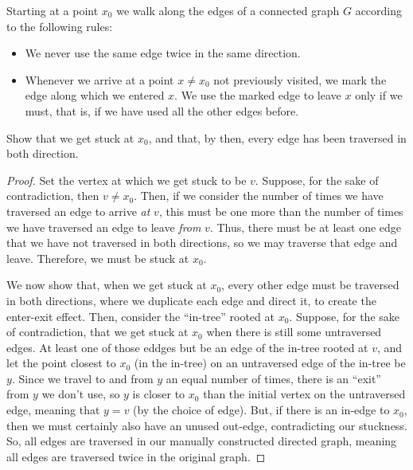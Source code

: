 \documentclass[11pt]{article}
\begin{document}
\begin{quest}
    Starting at a point $x_0$ we walk along the edges of a connected graph $G$ according to the following rules:
    \begin{itemize}
        \item We never use the same edge twice in the same direction.
        \item Whenever we arrive at a point $x\neq x_0$ not previously visited, we mark the edge along which we entered $x$. We use the marked edge to leave $x$ only if we must, that is, if we have used all the other edges before.
    \end{itemize}
    Show that we get stuck at $x_0$, and that, by then, every edge has been traversed in both direction.
\end{quest}
\begin{proof}
    Set the vertex at which we get stuck to be $v$. Suppose, for the sake of contradiction, then $v\neq x_0$. Then, if we consider the number of times we have traversed an edge to arrive \textit{at} $v$, this must be one more than the number of times we have traversed an edge to leave \textit{from} $v$. Thus, there must be at least one edge that we have not traversed in both directions, so we may traverse that edge and leave. Therefore, we must be stuck at $x_0$.

    We now show that, when we get stuck at $x_0$, every other edge must be traversed in both directions, where we duplicate each edge and direct it, to create the enter-exit effect. Then, consider the ``in-tree'' rooted at $x_0$. Suppose, for the sake of contradiction, that we get stuck at $x_0$ when there is still some untraversed edges. At least one of those eddges but be an edge of the in-tree rooted at $v$, and let the point closest to $x_0$ (in the in-tree) on an untraversed edge of the in-tree be $y$. Since we travel to and from $y$ an equal number of times, there is an ``exit'' from $y$ we don't use, so $y$ is closer to $x_0$ than the initial vertex on the untraversed edge, meaning that $y=v$ (by the choice of edge). But, if there is an in-edge to $x_0$, then we must certainly also have an unused out-edge, contradicting our stuckness. So, all edges are traversed in our manually constructed directed graph, meaning all edges are traversed twice in the original graph.
\end{proof}
\end{document}
